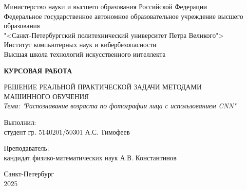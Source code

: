 \thispagestyle{empty}

\begin{center}
    Министерство науки и высшего образования Российской Федерации \\
    Федеральное государственное автономное образовательное учреждение высшего образования \\
    "<Санкт-Петербургский политехнический университет Петра Великого"> \\
    Институт компьютерных наук и кибербезопасности \\ Высшая школа технологий искусственного интеллекта
\end{center}

\vspace{1cm}

\begin{center}
	\textbf{КУРСОВАЯ РАБОТА}
	
		РЕШЕНИЕ РЕАЛЬНОЙ ПРАКТИЧЕСКОЙ ЗАДАЧИ МЕТОДАМИ МАШИННОГО ОБУЧЕНИЯ\\
		
		
		\textit{Тема: "Распознавание возраста по фотографии лица с использованием CNN"}
\end{center}

\vfill

    \noindent Выполнил: \\
    {студент гр. 5140201/50301 \hfill А.С. Тимофеев}

    \vspace{20pt}

    \noindent Преподаватель: \\
    {кандидат физико-математических наук \hfill А.В. Константинов}

\vfill

\begin{center}
    Санкт-Петербург\\
    2025
\end{center}